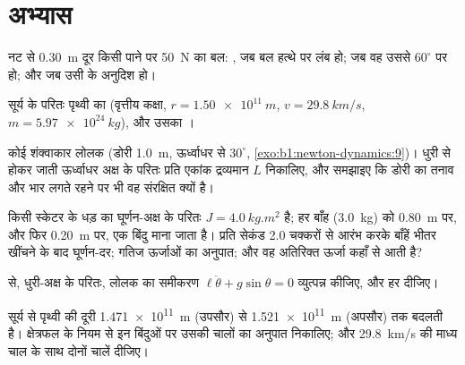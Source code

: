 \section{अभ्यास}

\begin{exercise}[$\star$]\label{exo:b1:angular-momentum:1}
नट से \qty{0.30}{m} दूर किसी पाने पर \qty{50}{N} का बल: , जब बल हत्थे
पर लंब हो; जब वह उससे $60^\circ$ पर हो; और जब उसी के अनुदिश हो।
\end{exercise}

\begin{exercise}[$\star$]\label{exo:b1:angular-momentum:2}
सूर्य के परितः पृथ्वी का  (वृत्तीय कक्षा,
$r = \qty{1.50e11}{m}$, $v = \qty{29.8}{km/s}$, $m = \qty{5.97e24}{kg}$),
और उसका ।
\end{exercise}

\begin{exercise}[$\star$]\label{exo:b1:angular-momentum:3}
कोई शंक्वाकार लोलक (डोरी \qty{1.0}{m}, ऊर्ध्वाधर से $30^\circ$,
\cref{exo:b1:newton-dynamics:9})। धुरी से होकर जाती ऊर्ध्वाधर अक्ष के परितः
प्रति एकांक द्रव्यमान $L$ निकालिए, और समझाइए कि डोरी का तनाव और भार लगते
रहने पर भी वह संरक्षित क्यों है।
\end{exercise}

\begin{exercise}[$\star$]\label{exo:b1:angular-momentum:4}
किसी स्केटर के धड़ का घूर्णन-अक्ष के परितः $J = \qty{4.0}{kg.m^2}$ है; हर
बाँह (\qty{3.0}{kg}) को \qty{0.80}{m} पर, और फिर \qty{0.20}{m} पर, एक बिंदु
माना जाता है। प्रति सेकंड \qty{2.0}{} चक्करों से आरंभ करके बाँहें भीतर
खींचने के बाद घूर्णन-दर; गतिज ऊर्जाओं का अनुपात; और वह अतिरिक्त ऊर्जा कहाँ
से आती है?
\end{exercise}

\begin{exercise}[$\star\star$]\label{exo:b1:angular-momentum:5}
 से, धुरी-अक्ष के परितः, लोलक का समीकरण
$\ell\ddot\theta + g\sin\theta = 0$ व्युत्पन्न कीजिए, और हर 
दीजिए।
\end{exercise}

\begin{exercise}[$\star\star$]\label{exo:b1:angular-momentum:6}
सूर्य से पृथ्वी की दूरी \qty{1.471e11}{m} (उपसौर) से \qty{1.521e11}{m}
(अपसौर) तक बदलती है। क्षेत्रफल के नियम से इन बिंदुओं पर उसकी चालों का
अनुपात निकालिए; और \qty{29.8}{km/s} की माध्य चाल के साथ दोनों चालें दीजिए।
\end{exercise}

